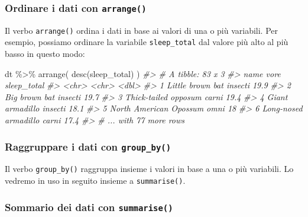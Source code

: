 \documentclass[
  10pt,
  italian,
  a4paper,
  extrafontsizes,onecolumn,openright
  ]{memoir}
\newenvironment{Shaded}{\begin{snugshade}}{\end{snugshade}}
\newcommand{\CommentTok}[1]{\textcolor[rgb]{0.56,0.35,0.01}{\textit{#1}}}
\newcommand{\FunctionTok}[1]{\textcolor[rgb]{0.00,0.00,0.00}{#1}}
\newcommand{\NormalTok}[1]{#1}
\newcommand{\SpecialCharTok}[1]{\textcolor[rgb]{0.00,0.00,0.00}{#1}}
\begin{document}
\hypertarget{ordinare-i-dati-con-arrange}{%
\subsubsection{\texorpdfstring{Ordinare i dati con \texttt{arrange()}}{Ordinare i dati con arrange()}}\label{ordinare-i-dati-con-arrange}}

Il verbo \texttt{arrange()} ordina i dati in base ai valori di una o più variabili. Per esempio, possiamo ordinare la variabile \texttt{sleep\_total} dal valore più alto al più basso in questo modo:

\begin{Shaded}
\begin{Highlighting}[]
\NormalTok{dt }\SpecialCharTok{\%\textgreater{}\%} 
  \FunctionTok{arrange}\NormalTok{(}
    \FunctionTok{desc}\NormalTok{(sleep\_total)}
\NormalTok{  )}
\CommentTok{\#\textgreater{} \# A tibble: 83 x 3}
\CommentTok{\#\textgreater{}   name                   vore    sleep\_total}
\CommentTok{\#\textgreater{}   \textless{}chr\textgreater{}                  \textless{}chr\textgreater{}         \textless{}dbl\textgreater{}}
\CommentTok{\#\textgreater{} 1 Little brown bat       insecti        19.9}
\CommentTok{\#\textgreater{} 2 Big brown bat          insecti        19.7}
\CommentTok{\#\textgreater{} 3 Thick{-}tailed opposum   carni          19.4}
\CommentTok{\#\textgreater{} 4 Giant armadillo        insecti        18.1}
\CommentTok{\#\textgreater{} 5 North American Opossum omni           18  }
\CommentTok{\#\textgreater{} 6 Long{-}nosed armadillo   carni          17.4}
\CommentTok{\#\textgreater{} \# ... with 77 more rows}
\end{Highlighting}
\end{Shaded}

\hypertarget{raggruppare-i-dati-con-group_by}{%
\subsubsection{\texorpdfstring{Raggruppare i dati con \texttt{group\_by()}}{Raggruppare i dati con group\_by()}}\label{raggruppare-i-dati-con-group_by}}

Il verbo \texttt{group\_by()} raggruppa insieme i valori in base a una o più variabili. Lo vedremo in uso in seguito insieme a \texttt{summarise()}.

\hypertarget{sommario-dei-dati-con-summarise}{%
\subsubsection{\texorpdfstring{Sommario dei dati con \texttt{summarise()}}{Sommario dei dati con summarise()}}\label{sommario-dei-dati-con-summarise}}
\end{document}

